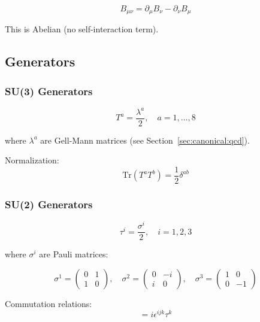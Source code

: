 \begin{equation}
\label{eq:canonical:sm_hypercharge}
B_{\mu\nu} = \partial_\mu B_\nu - \partial_\nu B_\mu
\end{equation}

This is Abelian (no self-interaction term).

\subsection{Generators}

\subsubsection{SU(3) Generators}

\begin{equation}
T^a = \frac{\lambda^a}{2}, \quad a = 1, \ldots, 8
\end{equation}

where $\lambda^a$ are Gell-Mann matrices (see Section~\ref{sec:canonical:qcd}).

Normalization:
\begin{equation}
\text{Tr}(T^a T^b) = \frac{1}{2}\delta^{ab}
\end{equation}

\subsubsection{SU(2) Generators}

\begin{equation}
\tau^i = \frac{\sigma^i}{2}, \quad i = 1, 2, 3
\end{equation}

where $\sigma^i$ are Pauli matrices:

\begin{equation}
\sigma^1 = \begin{pmatrix} 0 & 1 \\ 1 & 0 \end{pmatrix}, \quad
\sigma^2 = \begin{pmatrix} 0 & -i \\ i & 0 \end{pmatrix}, \quad
\sigma^3 = \begin{pmatrix} 1 & 0 \\ 0 & -1 \end{pmatrix}
\end{equation}

Commutation relations:
\begin{equation}
[\tau^i, \tau^j] = i\epsilon^{ijk}\tau^k
\end{equation}

